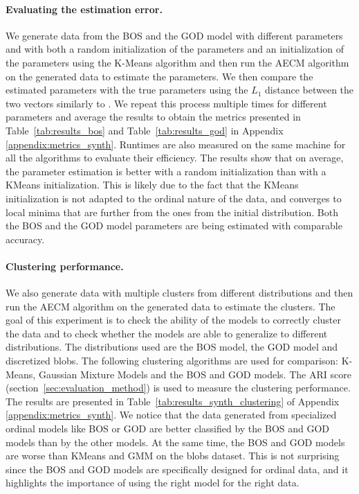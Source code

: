\paragraph{Evaluating the estimation error.}
We generate data from the BOS and the GOD model with different parameters and with both a random initialization of the parameters and an initialization of the parameters using the K-Means algorithm and then run the AECM algorithm on the generated data to estimate the parameters. We then compare the estimated parameters with the true parameters using the $L_1$ distance between the two vectors similarly to \cite{biernacki2016model}. We repeat this process multiple times for different parameters and average the results to obtain the metrics presented in Table~\ref{tab:results_bos} and Table~\ref{tab:results_god} in Appendix \ref{appendix:metrics_synth}. Runtimes are also measured on the same machine for all the algorithms to evaluate their efficiency.
The results show that on average, the parameter estimation is better with a random initialization than with a KMeans initialization. This is likely due to the fact that the KMeans initialization is not adapted to the ordinal nature of the data, and converges to local minima that are further from the ones from the initial distribution. Both the BOS and the GOD model parameters are being estimated with comparable accuracy.

\paragraph{Clustering performance.}
We also generate data with multiple clusters from different distributions and then run the AECM algorithm on the generated data to estimate the clusters. The goal of this experiment is to check the ability of the models to correctly cluster the data and to check whether the models are able to generalize to different distributions.
The distributions used are the BOS model, the GOD model and discretized blobs.
The following clustering algorithms are used for comparison: K-Means, Gaussian Mixture Models and the BOS and GOD models. The ARI score (section~\ref{sec:evaluation_method}) is used to measure the clustering performance. The results are presented in Table~\ref{tab:results_synth_clustering} of Appendix \ref{appendix:metrics_synth}.
We notice that the data generated from specialized ordinal models like BOS or GOD are better classified by the BOS and GOD models than by the other models. At the same time, the BOS and GOD models are worse than KMeans and GMM on the blobs dataset. This is not surprising since the BOS and GOD models are specifically designed for ordinal data, and it highlights the importance of using the right model for the right data.

